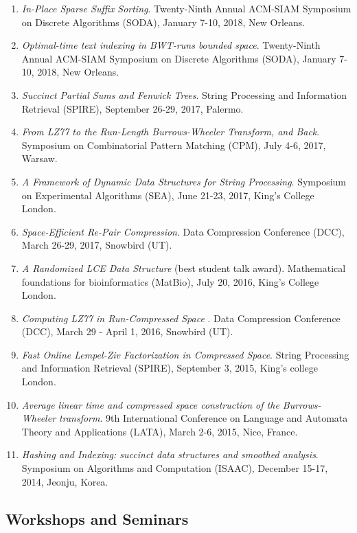 \documentclass{article}
\begin{document}
\begin{enumerate}
\setlength\itemsep{-1pt}
\item \emph{In-Place Sparse Suffix Sorting}. Twenty-Ninth Annual ACM-SIAM Symposium on Discrete Algorithms (SODA), January 7-10, 2018, New Orleans.
\item \emph{Optimal-time text indexing in BWT-runs bounded space}. Twenty-Ninth Annual ACM-SIAM Symposium on Discrete Algorithms (SODA), January 7-10, 2018, New Orleans.
\item \emph{Succinct Partial Sums and Fenwick Trees}. String Processing and Information Retrieval (SPIRE), September 26-29, 2017, Palermo.
\item \emph{From LZ77 to the Run-Length Burrows-Wheeler Transform, and Back}. Symposium on Combinatorial Pattern Matching (CPM), July 4-6, 2017, Warsaw.
\item \emph{A Framework of Dynamic Data Structures for String Processing}. Symposium on Experimental Algorithms (SEA), June 21-23, 2017, King's College London.
\item \emph{Space-Efficient Re-Pair Compression}.
Data Compression Conference (DCC), March 26-29, 2017, Snowbird (UT).
\item \emph{A Randomized LCE Data Structure} (best student talk award). Mathematical foundations for bioinformatics (MatBio), July 20, 2016, King's College London.
\item \emph{Computing LZ77 in Run-Compressed Space }.
 Data Compression Conference (DCC), March 29 - April 1, 2016, Snowbird (UT).
\item \emph{Fast Online Lempel-Ziv Factorization in Compressed Space}. String Processing and Information Retrieval (SPIRE), September 3, 2015, King's college London.
\item \emph{Average linear time and compressed space construction of the Burrows-Wheeler transform}. 9th International Conference on Language and Automata Theory and Applications (LATA), March 2-6, 2015, Nice, France.
\item \emph{Hashing and Indexing: succinct data structures and smoothed analysis}. Symposium on Algorithms and Computation (ISAAC), December 15-17, 2014, Jeonju, Korea.
\end{enumerate}


\subsection*{Workshops and Seminars}
\end{document}
